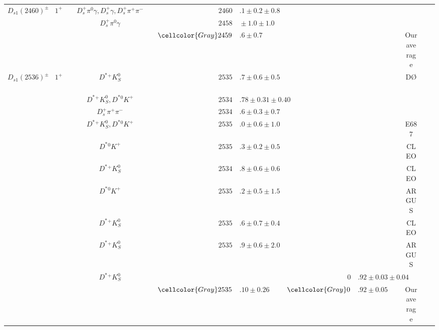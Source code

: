 \begin{adjustbox}{width=\textwidth,center}
{\begin{tabular}{cp{5pt}cp{5pt}cp{5pt}r@{}lp{5pt}r@{}lp{5pt}cp{5pt}c}
	\multirow{3}{*}{$D_{s1}(2460)^{\pm}$}	&&	\multirow{3}{*}{$1^{+}$}	&&	$D_{s}^{+}\pi^{0}\gamma, D_{s}^{+}\gamma, D_{s}^{+}\pi^{+}\pi^{-}$	&&$	2460$&$.1\pm0.2\pm0.8	$&&$	$&$	$&&	\babar{}	&&	\cite{Aubert:2006bk}          \\
		&&		&&	$D_{s}^{+}\pi^{0}\gamma$	&&$	2458$&${}\pm1.0\pm1.0	$&&$	$&$	$&&	\babar{}	&&	\cite{Aubert:2003pe}          \\ \cmidrule{6-14}
		&&		&&		&\cellcolor{Gray}&$	\cellcolor{Gray}  2459$&\cellcolor{Gray}$.6 \pm 0.7	$&\cellcolor{Gray}&	\cellcolor{Gray}&\cellcolor{Gray}	&\cellcolor{Gray}&	\cellcolor{Gray} Our average	&\cellcolor{Gray}&	\\ \midrule
	\multirow{11}{*}{$D_{s1}(2536)^{\pm}$}	&&	\multirow{11}{*}{$1^{+}$}	&&	$D^{*}{}^{+}K_{S}^{0}$	&&$	2535$&$.7\pm0.6\pm0.5	$&&$	$&$	$&&	D\O\ &&\cite{Abazov:2007wg}		\\
		&&		&&	$D^{*}{}^{+}K_{S}^{0}, D^{*}{}^{0}K^{+}$	&&$	2534$&$.78\pm0.31\pm0.40	$&&$	$&$	$&&	\babar{}	&&	\cite{Aubert:2007rva}         \\
		&&		&&	$D_{s}^{+}\pi^{+}\pi^{-}$	&&$	2534$&$.6\pm0.3\pm0.7	$&&$	$&$	$&&	\babar{}	&&	\cite{Aubert:2006bk}          \\
		&&		&&	$D^{*}{}^{+}K_{S}^{0}, D^{*}{}^{0}K^{+}$	&&$	2535$&$.0\pm0.6\pm1.0	$&&$	$&$	$&&	E687	&&	\cite{Frabetti:1993vv}        \\
		&&		&&	$D^{*}{}^{0}K^{+}$	&&$	2535$&$.3\pm0.2\pm0.5	$&&$	$&$	$&&	CLEO	&&	\cite{Alexander:1993nq}       \\
		&&		&&	$D^{*}{}^{+}K_{S}^{0}$	&&$	2534$&$.8\pm0.6\pm0.6	$&&$	$&$	$&&	CLEO	&&	\cite{Alexander:1993nq}       \\
		&&		&&	$D^{*}{}^{0}K^{+}$	&&$	2535$&$.2\pm0.5\pm1.5	$&&$	$&$	$&&	ARGUS	&&	\cite{Albrecht:1992zh}        \\
		&&		&&	$D^{*}{}^{+}K_{S}^{0}$	&&$	2535$&$.6\pm0.7\pm0.4	$&&$	$&$	$&&	CLEO	&&	\cite{Avery:1989ui}           \\
		&&		&&	$D^{*}{}^{+}K_{S}^{0}$	&&$	2535$&$.9\pm0.6\pm2.0	$&&$	$&$	$&&	ARGUS	&&	\cite{Albrecht:1989yi}        \\
		&&		&&	$D^{*}{}^{+}K_{S}^{0}$	&&$	$&$	$&&$	0$&$.92\pm0.03\pm0.04	$&&	\babar{}	&&	\cite{Lees:2011um}            \\ \cmidrule{6-14}
		&&		&&		&\cellcolor{Gray}&$	\cellcolor{Gray}2535$&\cellcolor{Gray}$.10 \pm 0.26	$&\cellcolor{Gray}&$	\cellcolor{Gray}0$&\cellcolor{Gray}$.92\pm0.05	$&\cellcolor{Gray}&	\cellcolor{Gray} Our average	&\cellcolor{Gray}&	\\ \midrule
													

\end{tabular}}
\end{adjustbox}
